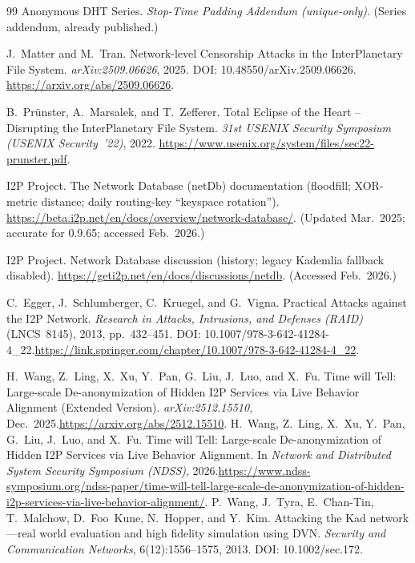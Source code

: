 \documentclass[11pt]{article}
\begin{document}
\begin{thebibliography}{99}
Anonymous DHT Series.
\emph{Stop-Time Padding Addendum (unique-only)}.
(Series addendum, already published.)

J.~Matter and M.~Tran.
Network-level Censorship Attacks in the InterPlanetary File System.
\emph{arXiv:2509.06626}, 2025. DOI: 10.48550/arXiv.2509.06626.
\url{https://arxiv.org/abs/2509.06626}.

B.~Pr\"unster, A.~Marsalek, and T.~Zefferer.
Total Eclipse of the Heart -- Disrupting the InterPlanetary File System.
\emph{31st USENIX Security Symposium (USENIX Security~'22)}, 2022.
\url{https://www.usenix.org/system/files/sec22-prunster.pdf}.

I2P Project.
The Network Database (netDb) documentation (floodfill; XOR-metric distance; daily routing-key ``keyspace rotation'').
\url{https://beta.i2p.net/en/docs/overview/network-database/}.
(Updated Mar.~2025; accurate for 0.9.65; accessed Feb.~2026.)

I2P Project.
Network Database discussion (history; legacy Kademlia fallback disabled).
\url{https://geti2p.net/en/docs/discussions/netdb}.
(Accessed Feb.~2026.)

C.~Egger, J.~Schlumberger, C.~Kruegel, and G.~Vigna.
Practical Attacks against the I2P Network.
\emph{Research in Attacks, Intrusions, and Defenses (RAID)} (LNCS~8145), 2013, pp.~432--451.
DOI: 10.1007/978-3-642-41284-4\_22.\;\url{https://link.springer.com/chapter/10.1007/978-3-642-41284-4_22}.

H.~Wang, Z.~Ling, X.~Xu, Y.~Pan, G.~Liu, J.~Luo, and X.~Fu.
\newblock Time will Tell: Large-scale De-anonymization of Hidden I2P Services via Live Behavior Alignment (Extended Version).
\newblock \emph{arXiv:2512.15510}, Dec.\ 2025.\;\url{https://arxiv.org/abs/2512.15510}.
H.~Wang, Z.~Ling, X.~Xu, Y.~Pan, G.~Liu, J.~Luo, and X.~Fu.
\newblock Time will Tell: Large-scale De-anonymization of Hidden I2P Services via Live Behavior Alignment.
\newblock In \emph{Network and Distributed System Security Symposium (NDSS)}, 2026.\;\url{https://www.ndss-symposium.org/ndss-paper/time-will-tell-large-scale-de-anonymization-of-hidden-i2p-services-via-live-behavior-alignment/}.
P.~Wang, J.~Tyra, E.~Chan-Tin, T.~Malchow, D.~Foo~Kune, N.~Hopper, and Y.~Kim.
Attacking the Kad network---real world evaluation and high fidelity simulation using DVN.
\emph{Security and Communication Networks}, 6(12):1556--1575, 2013.
DOI: 10.1002/sec.172.



\end{thebibliography}
\end{document}
